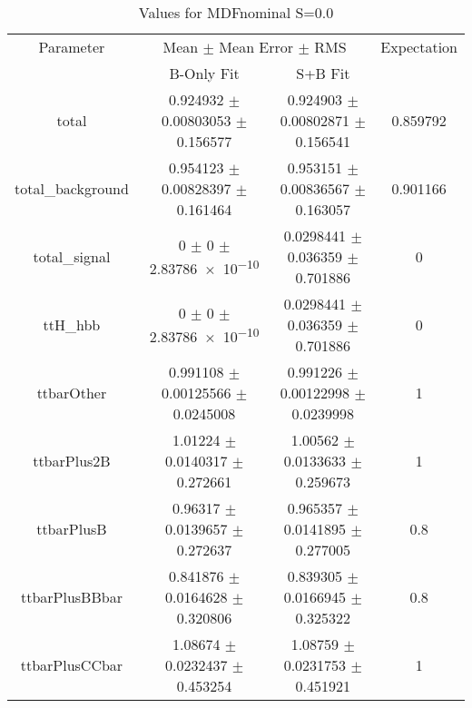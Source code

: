 \begin{table}
\centering
\caption{Values for MDFnominal S=0.0}
\begin{tabular}{cccc}
\toprule
Parameter & \multicolumn{2}{c}{Mean $\pm$ Mean Error $\pm$ RMS} & Expectation\\
 & B-Only Fit & S+B Fit & \\
\midrule
total & \num{0.924932} $\pm$ \num{0.00803053} $\pm$ \num{0.156577} & \num{0.924903} $\pm$ \num{0.00802871} $\pm$ \num{0.156541} & \num{0.859792}\\
total\_background & \num{0.954123} $\pm$ \num{0.00828397} $\pm$ \num{0.161464} & \num{0.953151} $\pm$ \num{0.00836567} $\pm$ \num{0.163057} & \num{0.901166}\\
total\_signal & \num{0} $\pm$ \num{0} $\pm$ \num{2.83786e-10} & \num{0.0298441} $\pm$ \num{0.036359} $\pm$ \num{0.701886} & \num{0}\\
ttH\_hbb & \num{0} $\pm$ \num{0} $\pm$ \num{2.83786e-10} & \num{0.0298441} $\pm$ \num{0.036359} $\pm$ \num{0.701886} & \num{0}\\
ttbarOther & \num{0.991108} $\pm$ \num{0.00125566} $\pm$ \num{0.0245008} & \num{0.991226} $\pm$ \num{0.00122998} $\pm$ \num{0.0239998} & \num{1}\\
ttbarPlus2B & \num{1.01224} $\pm$ \num{0.0140317} $\pm$ \num{0.272661} & \num{1.00562} $\pm$ \num{0.0133633} $\pm$ \num{0.259673} & \num{1}\\
ttbarPlusB & \num{0.96317} $\pm$ \num{0.0139657} $\pm$ \num{0.272637} & \num{0.965357} $\pm$ \num{0.0141895} $\pm$ \num{0.277005} & \num{0.8}\\
ttbarPlusBBbar & \num{0.841876} $\pm$ \num{0.0164628} $\pm$ \num{0.320806} & \num{0.839305} $\pm$ \num{0.0166945} $\pm$ \num{0.325322} & \num{0.8}\\
ttbarPlusCCbar & \num{1.08674} $\pm$ \num{0.0232437} $\pm$ \num{0.453254} & \num{1.08759} $\pm$ \num{0.0231753} $\pm$ \num{0.451921} & \num{1}\\
\bottomrule
\end{tabular}
\end{table}